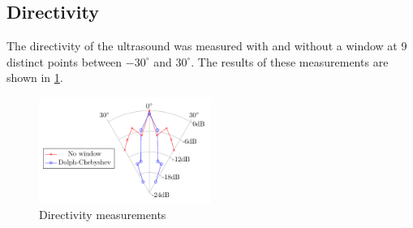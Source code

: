\subsection{Directivity}
The directivity of the ultrasound was measured with and without a window at 9 distinct points between $-30^\circ$ and $30^\circ$. The results of these measurements are shown in \ref{6.2.1_fig:Directivity_measurements}.
\begin{center}
    \begin{figure}[h!]
        \centering
        \includegraphics[width=0.5\textwidth]{images/6_Measurements/Polar_PlotDirectivity_Measurement.pdf}
        \caption{Directivity measurements}
        \label{6.2.1_fig:Directivity_measurements}
    \end{figure}
\end{center}
